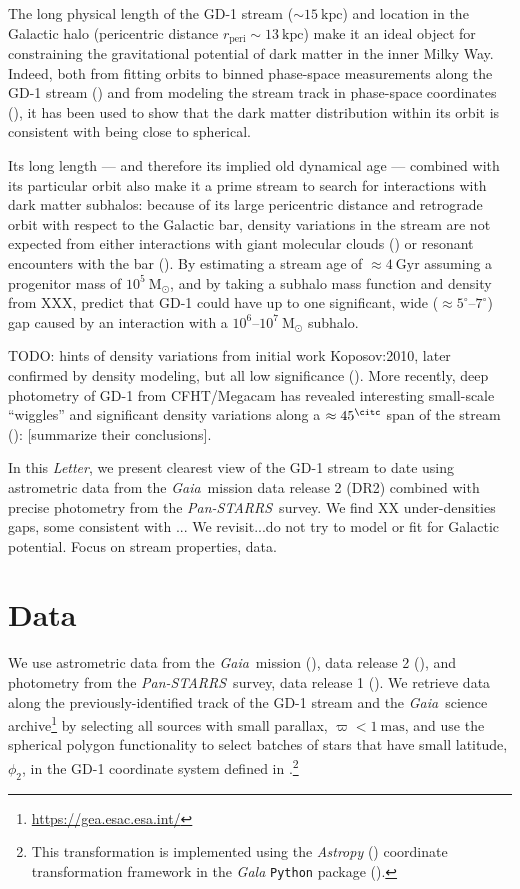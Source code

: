\documentclass[modern]{aastex62}
\newcommand{\acronym}[1]{{\small{#1}}}
\newcommand{\package}[1]{\textsl{#1}}
\newcommand{\gaia}{\textsl{Gaia}}
\newcommand{\pans}{\textsl{Pan-STARRS}}
\newcommand{\DR}{\acronym{DR2}}
\newcommand{\msun}{\textrm{M}_\odot}
\newcommand{\kpc}{\textrm{kpc}}
\newcommand{\article}{\textsl{Letter}}
\begin{document}
The long physical length of the GD-1 stream ($\sim 15~\kpc$) and location in the
Galactic halo (pericentric distance $r_\textrm{peri} \sim 13~\kpc$) make it an
ideal object for constraining the gravitational potential of dark matter in the
inner Milky Way.
Indeed, both from fitting orbits to binned phase-space measurements along the
GD-1 stream (\citealt{Koposov:2010}) and from modeling the stream track in
phase-space coordinates (\citealt{Bovy:2016}), it has been used to show that the
dark matter distribution within its orbit is consistent with being close to
spherical.

Its long length --- and therefore its implied old dynamical age --- combined
with its particular orbit also make it a prime stream to search for interactions
with dark matter subhalos:
because of its large pericentric distance and retrograde orbit with respect to
the Galactic bar, density variations in the stream are not expected from either
interactions with giant molecular clouds (\citealt{Amorisco:2016}) or resonant
encounters with the bar (\citealt{Pearson:2017}).
By estimating a stream age of $\approx 4~\textrm{Gyr}$ assuming a progenitor
mass of $10^5~\msun$, and by taking a subhalo mass function and density from
XXX, \citet{Erkal:2016} predict that GD-1 could have up to one significant, wide
($\approx 5^\circ$--$7^\circ$) gap caused by an interaction with a
$10^6$--$10^7~\msun$ subhalo.

TODO: hints of density variations from initial work Koposov:2010, later confirmed by density modeling, but all low significance
(\citealt{Carlberg:2013}).
More recently, deep photometry of GD-1 from CFHT/Megacam has revealed
interesting small-scale ``wiggles'' and significant density variations along a $\approx 45^\citc$ span of the stream (\citealt{DeBoer:2017}):
[summarize their conclusions].

In this \article, we present clearest view of the GD-1 stream to date using
astrometric data from the \gaia\ mission data release 2 (\DR) combined with
precise photometry from the \pans\ survey.
We find XX under-densities gaps, some consistent with ...
We revisit...do not try to model or fit for Galactic potential.
Focus on stream properties, data.

\section{Data}
\label{sec:data}

We use astrometric data from the \gaia\ mission (\citealt{Prusti:2016}), data
release 2 (\citealt{Gaia-Collaboration:2018, Lindegren:2018}), and photometry
from the \pans\ survey, data release 1 (\citealt{Chambers:2016}).
We retrieve data along the previously-identified track of the GD-1 stream and
the \gaia\ science archive\footnote{\url{https://gea.esac.esa.int/}} by
selecting all sources with small parallax, $\varpi < 1~\textrm{mas}$, and use
the spherical polygon functionality to select batches of stars that have small
latitude, $\phi_2$, in the GD-1 coordinate system defined in
\cite{Koposov:2010}.\footnote{This transformation is implemented using the
\package{Astropy} (\citealt{astropy}) coordinate transformation framework in the
\package{Gala} \texttt{Python} package (\citealt{gala}).}
\end{document}
